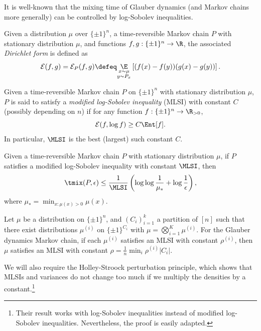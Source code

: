 \documentclass[11pt,letterpaper]{article}
\begin{document}
    It is well-known that the mixing time of Glauber dynamics (and Markov chains more generally) can be controlled by log-Sobolev inequalities. 

    \begin{definition}
        Given a distribution $\mu$ over $\{\pm 1\}^n$, a time-reversible Markov chain $P$ with stationary distribution $\mu$, and functions $f,g : \{\pm 1\}^n \to \R$, the associated \emph{Dirichlet form} is defined as
        \[ \mathcal{E}(f,g) = \mathcal{E}_{P}(f,g) \defeq \underset{\substack{x \sim \mu \\ y \sim P_x}}{\E} \left[ (f(x) - f(y))(g(x) - g(y)) \right]. \]
    \end{definition}

    \begin{definition}
        Given a time-reversible Markov chain $P$ on $\{\pm 1\}^n$ with stationary distribution $\mu$, $P$ is said to satisfy a \emph{modified log-Sobolev inequality} (MLSI) with constant $C$ (possibly depending on $n$) if for any function $f : \{\pm 1\}^n \to \R_{> 0}$,
        \[ \mathcal{E}(f,\log f) \ge C \Ent[f]. \]
        In particular, $\MLSI$ is the best (largest) such constant $C$.
    \end{definition}

    \begin{fact}[{\cite[Corollary 2.8]{bt06}}]
        \label{fact:mixing-mlsi}
        Given a time-reversible Markov chain $P$ with stationary distribution $\mu$, if $P$ satisfies a modified log-Sobolev inequality with constant $\MLSI$, then
        \[ \tmix(P,\epsilon) \le \frac{1}{\MLSI}\left( \log \log \frac{1}{\mu_*} + \log \frac{1}{\epsilon} \right), \]
        where $\mu_* = \min_{x : \mu(x) > 0} \mu(x)$.
    \end{fact}

    \begin{fact}
        \label{fact:mlsi-product}
        Let $\mu$ be a distribution on $\{\pm 1\}^n$, and $(C_i)_{i=1}^{k}$ a partition of $[n]$ such that there exist distributions $\mu^{(i)}$ on $\{\pm 1\}^{C_i}$ with $\mu = \bigotimes_{i=1}^{K} \mu^{(i)}$. For the Glauber dynamics Markov chain, if each $\mu^{(i)}$ satisfies an MLSI with constant $\rho^{(i)}$, then $\mu$ satisfies an MLSI with constant $\rho = \frac{1}{n} \min_{i} \rho^{(i)} |C_i|$. 
    \end{fact}

    We will also require the Holley-Stroock perturbation principle, which shows that MLSIs and variances do not change too much if we multiply the densities by a constant.\footnote{Their result works with log-Sobolev inequalities instead of modified log-Sobolev inequalities.
    Nevertheless, the proof is easily adapted.}
\end{document}
